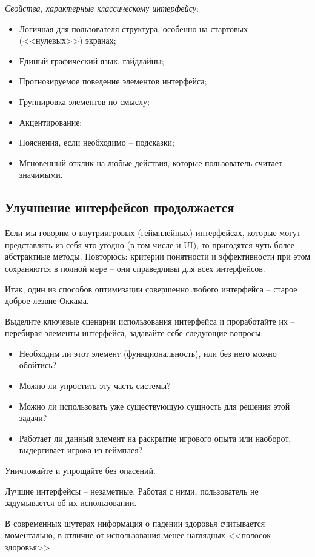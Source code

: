 \documentclass{article}
\begin{document}
\textit{Свойства, характерные классическому интерфейсу}:
\begin{itemize}
  \item Логичная для пользователя структура, особенно на стартовых (<<нулевых>>) экранах;
  \item Единый графический язык, гайдлайны;
  \item Прогнозируемое поведение элементов интерфейса;
  \item Группировка элементов по смыслу;
  \item Акцентирование;
  \item Пояснения, если необходимо -- подсказки;
  \item Мгновенный отклик на любые действия, которые пользователь считает значимыми.
\end{itemize}

\subsection{Улучшение интерфейсов продолжается}
Если мы говорим о внутриигровых (геймплейных) интерфейсах, которые могут представлять из себя что угодно (в том числе и UI), то пригодятся чуть более абстрактные методы. Повторюсь: критерии понятности и эффективности при этом сохраняются в полной мере -- они справедливы для всех интерфейсов.

Итак, один из способов оптимизации совершенно любого интерфейса -- старое доброе лезвие Оккама.

Выделите ключевые сценарии использования интерфейса и проработайте их -- перебирая элементы интерфейса, задавайте себе следующие вопросы:
\begin{itemize}
  \item Необходим ли этот элемент (функциональность), или без него можно обойтись?
  \item Можно ли упростить эту часть системы?
  \item Можно ли использовать уже существующую сущность для решения этой задачи?
  \item Работает ли данный элемент на раскрытие игрового опыта или наоборот, выдергивает игрока из геймплея?
\end{itemize}

Уничтожайте и упрощайте без опасений.

Лучшие интерфейсы -- незаметные. Работая с ними, пользователь не задумывается об их использовании.

В современных шутерах информация о падении здоровья считывается моментально, в отличие от использования менее наглядных <<полосок здоровья>>.
\end{document}
